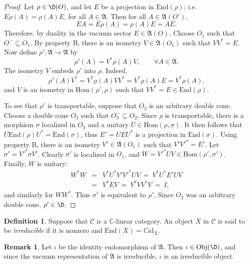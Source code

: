 \documentclass[11pt]{article}
\newcommand{\alg}[1]{\mathfrak{#1}}
\theoremstyle{definition}
\theoremstyle{definition}
\newtheorem{defn}[thm]{Definition}
\newtheorem{note}[thm]{Remark}
\theoremstyle{remark}
\newcommand{\Obj}{\mathrm{Obj}}
\def\2#1{{\mathcal #1}}
\def\7#1{{\mathbb #1}}
\newcommand{\Hom}{\mathrm{Hom}}
\newcommand{\End}{\mathrm{End}}
\def\id{\mathrm{id}}
\begin{document}
\begin{proof} Let $\rho \in \D (O)$, and let $E$ be a
  projection in $\End (\rho )$; i.e.\ $E\rho (A)=\rho
  (A)E$, for all $A\in \alg{A}$.  Then for all $A\in
  \alg{A}(O')$,$$ EA =E\rho (A)=\rho (A)E=AE.  $$
  Therefore, by duality in the vacuum sector $E\in
  \alg{A}(O)$.  Choose $O_1$ such that $O^{-}\subseteq
  O_1$.  By property B, there is an isometry $V\in
  \alg{A}(O_1)$ such that $VV^*=E$.  Now define $\rho
  ':\alg{A}\to \alg{A}$ by
  \begin{equation*} \rho '(A)=V^*\rho (A)V ,\qquad \forall A\in \alg{A}
    .\end{equation*} The isometry $V$ embeds $\rho '$ into $\rho$.  Indeed,
  \begin{equation*} \rho '(A)V^*=V^*\rho (A)VV^*=V^*\rho (A)E =V^*\rho (A)
    .\end{equation*} and $V$ is an isometry in $\Hom (\rho ',\rho )$ such that
  $VV^*=E\in \End (\rho )$.

  To see that $\rho '$ is transportable, suppose that
  $O_2$ is an arbitrary double cone.  Choose a double
  cone $O_3$ such that $O_3^{-}\subseteq O_2$.  Since
  $\rho$ is transportable, there is a morphism $\sigma$
  localized in $O_3$ and a unitary $U\in \Hom (\rho
  ,\sigma)$.  It then follows that $U\End (\rho
  )U^*=\End (\sigma )$, thus $E'=UEU^*$ is a projection
  in $\End (\sigma )$.  Using property B, there is an
  isometry $V'\in \alg{A}(O_1)$ such that
  $V'{V'}^*=E'$.  Let $\sigma '={V'}^*\sigma V'$.
  Clearly $\sigma '$ is localized in $O_1$, and
  $W={V'}^*UV\in \Hom (\rho ',\sigma ')$.  Finally, $W$
  is unitary:
  \begin{eqnarray*} W^*W &=& V^*U^*V'{V'}^*UV \: = \: V^*U^*E'UV \\
    &= & V^*EV \:= \: V^*VV^*V \: =\: I ,\end{eqnarray*} and similarly for $WW^*$.
  Thus $\sigma '$ is equivalent to $\rho '$.  Since $O_2$ was an arbitrary double
  cone, $\rho ' \in \D$.
\end{proof}

\begin{defn} Suppose that $\2C$ is a $\7C$-linear category.  An object $X$ in $\2C$
  is said to be \emph{irreducible} if it is nonzero and $\End (X)=\7C \id _X$.
\end{defn}

\begin{note} Let $\iota$ be the identity endomorphism of $\alg{A}$.  Then $\iota \in
  \Obj (\D )$, and since the vacuum representation of $\alg{A}$ is irreducible,
  $\iota$ is an irreducible object.  \end{note}
\end{document}
